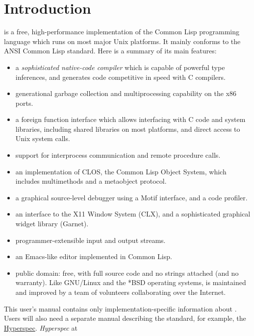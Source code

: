 \chapter{Introduction}

\cmucl{} is a free, high-performance implementation of the Common Lisp
programming language which runs on most major Unix platforms. It
mainly conforms to the ANSI Common Lisp standard. Here is a summary of
its main features:

\begin{itemize}
\item a {\em sophisticated native-code compiler} which is capable of
powerful type inferences, and generates code competitive in speed with
C compilers.

\item generational garbage collection and multiprocessing
capability on the x86 ports.

\item a foreign function interface which allows interfacing with C code and
system libraries, including shared libraries on most platforms, and
direct access to Unix system calls.

\item support for interprocess communication and remote procedure
calls.
     
\item an implementation of CLOS, the Common Lisp Object System, which
includes multimethods and a metaobject protocol.

\item a graphical source-level debugger using a Motif interface, and a
code profiler.

\item an interface to the X11 Window System (CLX), and a sophisticated
graphical widget library (Garnet).

\item programmer-extensible input and output streams.
                        
\item an Emacs-like editor implemented in Common Lisp.

\item public domain: free, with full source code and no
strings attached (and no warranty).  Like GNU/Linux and the *BSD
operating systems, \cmucl{} is maintained and improved by a team of
volunteers collaborating over the Internet.
\end{itemize}


This user's manual contains only implementation-specific information
about \cmucl. Users will also need a separate manual describing the
\clisp{} standard, for example, the
\ifpdf
\href{http://www.lispworks.com/documentation/HyperSpec/Front/index.htm}
{Hyperspec}.
\else
\emph{Hyperspec} at \href{http://www.lispworks.com/documentation/HyperSpec/Front/index.htm}
\fi


